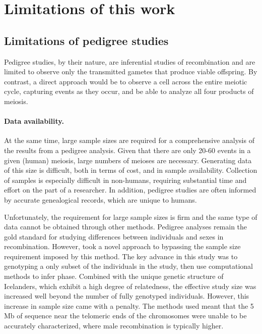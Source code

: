 \section{Limitations of this work}

\subsection{Limitations of pedigree studies}
Pedigree studies, by their nature, are inferential studies of recombination and are limited to observe only the transmitted gametes that produce viable offspring.
By contrast, a direct approach would be to observe a cell across the entire meiotic cycle, capturing events as they occur, and be able to analyze all four products of meiosis.

\paragraph{Data availability.}
At the same time, large sample sizes are required for a comprehensive analysis of the results from a pedigree analysis.
Given that there are only 20-60 events in a given (human) meiosis\cite{Broman1998,Coop2008,Kong2010}, large numbers of meioses are necessary.
Generating data of this size is difficult, both in terms of cost, and in sample availability.
Collection of samples is especially difficult in non-humans, requiring substantial time and effort on the part of a researcher.
In addition, pedigree studies are often informed by accurate genealogical records, which are unique to humans.

Unfortunately, the requirement for large sample sizes is firm and the same type of data cannot be obtained through other methods.
Pedigree analyses remain the gold standard for studying differences between individuals and sexes in recombination.
However, \citet{Kong2010} took a novel approach to bypassing the sample size requirement imposed by this method.
The key advance in this study was to genotyping a only subset of the individuals in the study, then use computational methods to infer phase.
Combined with the unique genetic structure of Icelanders, which exhibit a high degree of relatedness, the effective study size was increased well beyond the number of fully genotyped individuals.
However, this increase in sample size came with a penalty.
The methods used meant that the 5 Mb of sequence near the telomeric ends of the chromosomes were unable to be accurately characterized, where male recombination is typically higher.

